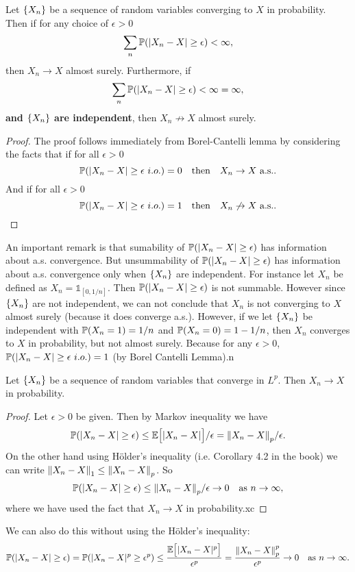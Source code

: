 \begin{theorem}
	Let $ \{X_n\} $ be a sequence of random variables converging to $ X $ in probability. Then if for any choice of $ \epsilon>0 $
	\[ \sum_{n}\mathbb{P}(|X_n - X| \geq \epsilon) <\infty, \]
	then $ X_n \to X $ almost surely. Furthermore, if
	\[ \sum_{n}\mathbb{P}(|X_n - X| \geq \epsilon) <\infty = \infty, \]
	\textbf{and $ \{X_n\} $ are independent}, then $ X_n \not\to X $ almost surely.
\end{theorem}
\begin{proof}
	The proof follows immediately from Borel-Cantelli lemma by considering the facts that if for all $ \epsilon>0 $
	\[ \mathbb{P}(|X_n-X|\geq \epsilon\ i.o.) = 0  \quad\text{then}\quad X_n\to X \ \text{a.s.}.  \]
	And if for all $ \epsilon>0 $
	\[ \mathbb{P}(|X_n-X|\geq \epsilon\ i.o.) = 1  \quad\text{then}\quad X_n\not\to X \ \text{a.s.}. \]
\end{proof}
\begin{remark}
	An important remark is that sumability of $ \mathbb{P}(|X_n - X|\geq \epsilon) $ has information about a.s. convergence. But unsummability of $ \mathbb{P}(|X_n - X|\geq \epsilon) $ has information about a.s. convergence only when $ \{X_n\} $ are independent. For instance let $ X_n $ be defined as $ X_n = \mathds{1}_{[0,1/n]} $. Then $ \mathbb{P}(|X_n - X|\geq \epsilon) $ is not summable. However since $ \{X_n\} $ are not independent, we can not conclude that $ X_n $ is not converging to $ X $ almost surely (because it does converge a.s.). However, if we let $ \{X_n\} $ be independent with $ \mathbb{P}(X_n=1) = 1/n $ and $ \mathbb{P}(X_n = 0) = 1-1/n $, then $ X_n $ converges to $ X $ in probability, but not almost surely. Because for any $ \epsilon>0 $, $ \mathbb{P}(|X_n - X| \geq \epsilon\ i.o.) = 1 $ (by Borel Cantelli Lemma).n
\end{remark}


\begin{theorem}
	Let $ \{X_n\} $ be a sequence of random variables that converge in $ L^p $. Then $ X_n \to X $ in probability.
\end{theorem}
\begin{proof}
	Let $ \epsilon>0 $ be given. Then by Markov inequality we have
	\[ \mathbb{P}(|X_n - X| \geq \epsilon) \leq \mathbb{E}\big[|X_n-X|\big]/\epsilon = \norm{X_n-X}_p/\epsilon. \]
	On the other hand using H\"{o}lder's inequality (i.e. Corollary 4.2 in the book) we can write $ \norm{X_n-X}_1 \leq \norm{X_n-X}_p $. So
	\[ \mathbb{P}(|X_n - X| \geq \epsilon) \leq  \norm{X_n - X}_p/\epsilon \to 0 \quad \text{as $ n\to\infty $}, \]
	where we have used the fact that $ X_n \to X $ in probability.xc
\end{proof}
\begin{remark}
	We can also do this without using the H\"{o}lder's inequality:
	\[ \mathbb{P}(|X_n - X| \geq \epsilon) = \mathbb{P}(|X_n - X|^p \geq \epsilon^p) \leq \frac{\mathbb{E}\big[|X_n - X|^p\big]}{\epsilon^p} = \frac{\norm{X_n-X}_p^p}{\epsilon^p} \to 0 \quad \text{as $ n\to\infty $}. \]
\end{remark}


